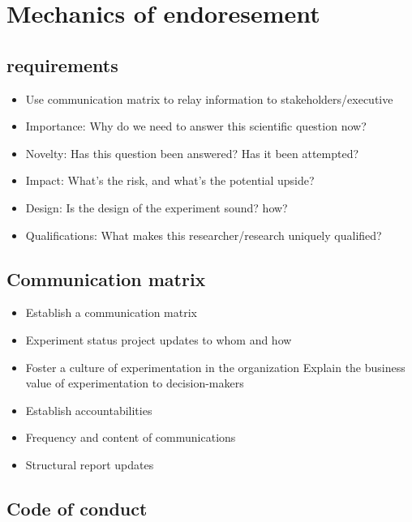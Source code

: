 \documentclass[]{book}
\providecommand{\tightlist}{%
  \setlength{\itemsep}{0pt}\setlength{\parskip}{0pt}}
\begin{document}
\hypertarget{mechanics-of-endoresement}{%
\chapter{Mechanics of endoresement}\label{mechanics-of-endoresement}}

\hypertarget{requirements}{%
\section{requirements}\label{requirements}}

\begin{itemize}
\tightlist
\item
  Use communication matrix to relay information to stakeholders/executive
\item
  Importance: Why do we need to answer this scientific question now?
\item
  Novelty: Has this question been answered? Has it been attempted?
\item
  Impact: What's the risk, and what's the potential upside?
\item
  Design: Is the design of the experiment sound? how?
\item
  Qualifications: What makes this researcher/research uniquely qualified?
\end{itemize}

\hypertarget{communication-matrix}{%
\section{Communication matrix}\label{communication-matrix}}

\begin{itemize}
\tightlist
\item
  Establish a communication matrix
\item
  Experiment status project updates to whom and how
\item
  Foster a culture of experimentation in the organization
  Explain the business value of experimentation to decision-makers
\item
  Establish accountabilities
\item
  Frequency and content of communications
\item
  Structural report updates
\end{itemize}

\hypertarget{code-of-conduct}{%
\section{Code of conduct}\label{code-of-conduct}}
\end{document}

